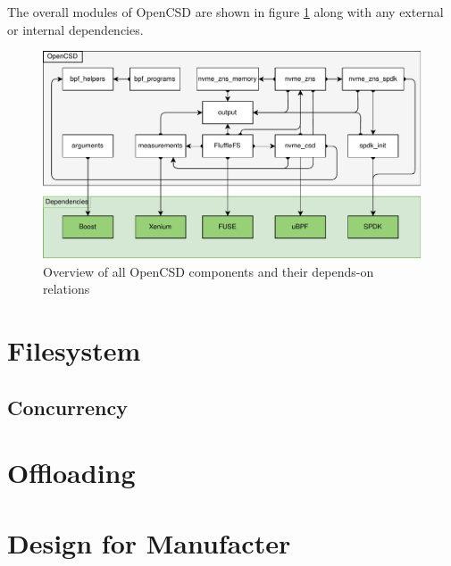 The overall modules of OpenCSD are shown in figure
\ref{figure:moduledependencies} along with any external or internal
dependencies.


\begin{figure}
    \centering
	\includegraphics[width=1\textwidth]{resources/images/module-dependencies.pdf}
	\caption{Overview of all OpenCSD components and their depends-on relations}
    \label{figure:moduledependencies}
\end{figure}

\section{Filesystem}


\subsection{Concurrency}

\section{Offloading}


\section{Design for Manufacter}


